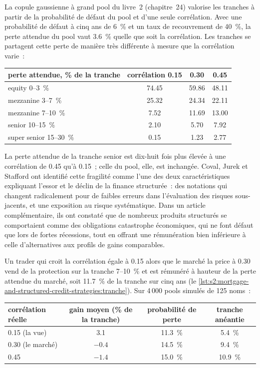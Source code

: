 La copule gaussienne à grand pool du livre~2 (chapitre~24) valorise les tranches à partir de la probabilité de défaut du pool et d'une seule corrélation. Avec une
probabilité de défaut à cinq ans de 6~\% et un taux de recouvrement de 40~\%, la perte attendue du pool vaut 3.6~\% quelle que soit la corrélation. Les tranches se partagent cette perte de manière très différente à mesure que
la corrélation varie~:

\begin{center}
\small
\begin{tabular}{@{}lccc@{}}
\toprule
perte attendue, \% de la tranche & corrélation 0.15 & 0.30 & 0.45\\
\midrule
equity 0--3~\% & 74.45 & 59.86 & 48.11\\
mezzanine 3--7~\% & 25.32 & 24.34 & 22.11\\
mezzanine 7--10~\% & 7.52 & 11.69 & 13.00\\
senior 10--15~\% & 2.10 & 5.70 & 7.92\\
super senior 15--30~\% & 0.15 & 1.23 & 2.77\\
\bottomrule
\end{tabular}
\end{center}

La perte attendue de la tranche senior est dix-huit fois plus élevée à une corrélation de 0.45 qu'à 0.15~; celle du pool, elle, est inchangée.
Coval, Jurek et Stafford ont identifié cette fragilité comme l'une des deux caractéristiques expliquant l'essor et le déclin de la finance structurée~: des notations qui changent radicalement pour de faibles erreurs
dans l'évaluation des risques sous-jacents, et une exposition au risque systématique. Dans un article complémentaire, ils ont constaté que de nombreux produits structurés se comportaient comme des
obligations catastrophe économiques, qui ne font défaut que lors de fortes récessions, tout en offrant une rémunération bien inférieure à celle d'alternatives aux profils de gains comparables.

Un trader qui croit la corrélation égale à 0.15 alors que le marché la price à 0.30 vend de la protection sur la tranche 7--10~\% et est rémunéré à hauteur de la
perte attendue du marché, soit 11.7~\% de la tranche sur cinq ans
(le \cref{lst:s2:mortgage-and-structured-credit-strategies:tranche}). Sur 4\,000 pools simulés de 125 noms~:

\begin{center}
\small
\begin{tabular}{@{}lccc@{}}
\toprule
corrélation réelle & gain moyen (\% de la tranche) & probabilité de perte & tranche anéantie\\
\midrule
0.15 (la vue) & 3.1 & 11.3~\% & 5.4~\%\\
0.30 (le marché) & $-0.4$ & 14.5~\% & 9.4~\%\\
0.45 & $-1.4$ & 15.0~\% & 10.9~\%\\
\bottomrule
\end{tabular}
\end{center}

